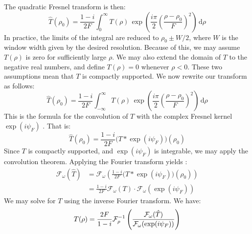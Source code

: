 \documentclass{article}
\theoremstyle{plain}
\begin{document}
        The quadratic Fresnel transform is then:
        \begin{equation}
            \hat{T}(\rho_{0})
            =\frac{1-i}{2F}\int_{0}^{\infty}
                T(\rho)\,\exp\left(
                    \frac{i\pi}{2}\left(\frac{\rho-\rho_{0}}{F}\right)^{2}
                \right)\,\textrm{d}\rho
        \end{equation}
        In practice, the limits of the integral are reduced to
        $\rho_{0}\pm{W}/2$, where $W$ is the window width given by the
        desired resolution. Because of this, we may assume
        $T(\rho)$ is zero for sufficiently large $\rho$.
        We may also extend the domain of $T$ to the negative real numbers, and
        define $T(\rho)=0$ whenever $\rho<0$. These two assumptions mean that
        $T$ is compactly supported. We now rewrite our transform as follows:
        \begin{equation}
            \hat{T}(\rho_{0})
            =\frac{1-i}{2F}\int_{-\infty}^{\infty}
                T(\rho)\,\exp\left(
                    \frac{i\pi}{2}\left(\frac{\rho-\rho_{0}}{F}\right)^{2}
                \right)\,\textrm{d}\rho
        \end{equation}
        This is the formula for the convolution of $T$ with the complex
        Fresnel kernel $\exp(i\psi_{F})$ \cite[Ch.~51]{KornerFourierAnalysis}.
        That is:
        \begin{equation}
            \hat{T}(\rho_{0})
            =\frac{1-i}{2F}\big(T*\exp(i\psi_{F})\big)(\rho_{0})
        \end{equation}
        Since $T$ is compactly supported, and $\exp(i\psi_{F})$ is integrable,
        we may apply the convolution theorem. Applying the Fourier transform
        yields \cite[Thm.~51.7]{KornerFourierAnalysis}:
        \begin{subequations}
            \begin{align}
                \mathcal{F}_{\omega}(\hat{T})
                &=\mathcal{F}_{\omega}\left(
                    \frac{1-i}{2F}\big(T*\exp(i\psi_{F})\big)(\rho_{0})
                \right)\\
                &=\frac{1-i}{2F}\mathcal{F}_{\omega}\left(T\right)\cdot
                    \mathcal{F}_{\omega}\left(\exp(i\psi_{F})\right)
            \end{align}
        \end{subequations}
        We may solve for $T$ using the inverse Fourier transform. We have:
        \begin{equation}
            T(\rho)=\frac{2F}{1-i}\mathcal{F}^{-1}_{\rho}\left(
                \frac{%
                    \mathcal{F}_{\omega}(\hat{T})%
                }{%
                    \mathcal{F}_{\omega}(\exp(i\psi_{F}))
                }
            \right)
        \end{equation}
\end{document}
